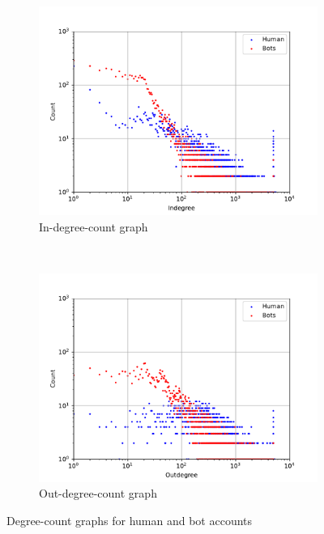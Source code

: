 \begin{figure}[t!]
    \centering
    \begin{subfigure}[t]{0.5\textwidth}
        \centering
        \includegraphics[width=\textwidth]{FIG/indegrees.pdf}
        \caption{In-degree-count graph}
    \end{subfigure}%
    ~
    \begin{subfigure}[t]{0.5\textwidth}
        \centering
        \includegraphics[width=\textwidth]{FIG/outdegrees.pdf}
        \caption{Out-degree-count graph}
    \end{subfigure}
    \caption{Degree-count graphs for human and bot accounts}
    \label{fig:degrees}
\end{figure}

